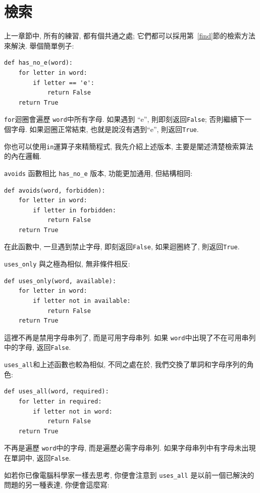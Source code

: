 \documentclass[10pt]{book}
\begin{document}
\section{檢索}
\label{search}

上一章節中, 所有的練習, 都有個共通之處;
它們都可以採用第~\ref{find}節的檢索方法來解決. 
舉個簡單例子:

\begin{verbatim}
def has_no_e(word):
    for letter in word:
        if letter == 'e':
            return False
    return True
\end{verbatim}
%
{\tt for}迴圈會遍歷 {\tt word}中所有字母. 
如果遇到 ``e'', 則即刻返回{\tt False};
否則繼續下一個字母. 
如果迴圈正常結束, 也就是說沒有遇到``e'',  則返回{\tt True}.

你也可以使用{\tt in}運算子來精簡程式, 
我先介紹上述版本, 主要是闡述清楚檢索算法的內在邏輯. 

{\tt avoids} 函數相比 \verb"has_no_e" 版本, 功能更加通用, 
但結構相同:

\begin{verbatim}
def avoids(word, forbidden):
    for letter in word:
        if letter in forbidden:
            return False
    return True
\end{verbatim}
%
在此函數中, 一旦遇到禁止字母, 即刻返回{\tt False}, 
如果迴圈終了, 則返回{\tt True}. 

\verb"uses_only" 與之極為相似, 無非條件相反:

\begin{verbatim}
def uses_only(word, available):
    for letter in word: 
        if letter not in available:
            return False
    return True
\end{verbatim}
%
這裡不再是禁用字母串列了, 而是可用字母串列. 
如果 {\tt word}中出現了不在可用串列中的字母, 返回{\tt False}.

\verb"uses_all"和上述函數也較為相似, 不同之處在於, 
我們交換了單詞和字母序列的角色:

\begin{verbatim}
def uses_all(word, required):
    for letter in required: 
        if letter not in word:
            return False
    return True
\end{verbatim}
%
不再是遍歷 {\tt word}中的字母, 
而是遍歷必需字母串列. 
如果字母串列中有字母未出現在單詞中, 返回{\tt False}.

如若你已像電腦科學家一樣去思考, 你便會注意到 \verb"uses_all" 
是以前一個已解決的問題的另一種表達, 你便會這麼寫:
\end{document}
